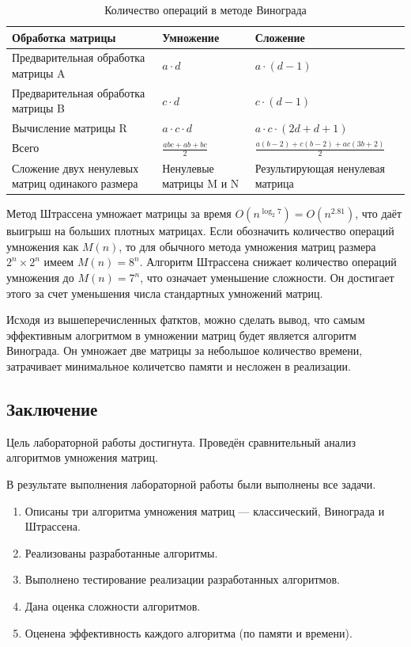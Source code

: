 \documentclass[12pt, a4paper]{article}
\begin{document}
\begin{table}[h!]
\begin{center}
\caption{Количество операций в методе Винограда}
\label{tab:my_label}
    \centering
    \begin{tabular}{ | m{5cm} | m{5cm}| m{6cm}|} 
  \hline
  Обработка матрицы & Умножение & Сложение \\ 
  \hline
  Предварительная обработка матрицы A & $a \cdot d$ & $a \cdot (d - 1)$\\
  \hline
  Предварительная обработка матрицы B & $c \cdot d$ & $c \cdot (d - 1)$\\
  \hline
  Вычисление матрицы R & $a \cdot c \cdot d$ & $a \cdot c \cdot (2d + d + 1)$\\
  \hline
  Всего & $\displaystyle\frac{abc + ab + bc}{2}$ & $\displaystyle\frac{a(b - 2) + c(b - 2) + ac(3b + 2)}{2}$\\
  \hline
  Сложение двух ненулевых матриц одинакого размера & Ненулевые матрицы M и N & Результирующая ненулевая матрица\\
  \hline
\end{tabular}
\end{center}
\end{table}

Метод Штрассена умножает матрицы за время  $O(n^{\log _{2}7})=O(n^{2.81})$, что даёт выигрыш на больших плотных матрицах. Если обозначить количество операций умножения как $M(n)$, то для обычного метода умножения матриц размера $2^n \times 2^n$ имеем $M(n) = 8^n$. Алгоритм Штрассена снижает количество операций умножения до $M(n) = 7^n$, что означает уменьшение сложности. Он достигает этого за счет уменьшения числа стандартных умножений матриц.

Исходя из вышеперечисленных фатктов, можно сделать вывод, что самым эффективным алогритмом в умножении матриц будет является алгоритм Винограда. Он умножает две матрицы за небольшое количество времени, затрачивает минимальное количетсво памяти и несложен в реализации.

\newpage
\begin{center}
    \section*{Заключение}
\end{center}
Цель лабораторной работы достигнута. Проведён сравнительный анализ алгоритмов умножения матриц.

В результате выполнения лабораторной работы были выполнены все задачи.
\begin{enumerate}
\item Описаны три алгоритма умножения матриц --- классический, Винограда и Штрассена.
\item Реализованы разработанные алгоритмы.
\item Выполнено тестирование реализации разработанных алгоритмов.
\item Дана оценка сложности алгоритмов.
\item Оценена эффективность каждого алгоритма (по памяти и времени).
\end{enumerate}
\end{document}
